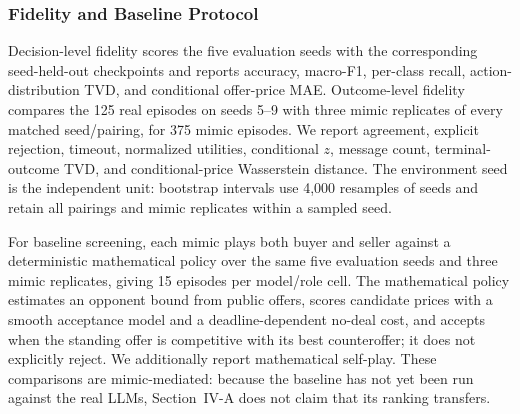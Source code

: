 \documentclass[conference]{IEEEtran}
\begin{document}
\subsubsection{Fidelity and Baseline Protocol}

Decision-level fidelity scores the five evaluation seeds with the corresponding seed-held-out checkpoints and reports accuracy, macro-F1, per-class recall, action-distribution TVD, and conditional offer-price MAE. Outcome-level fidelity compares the 125 real episodes on seeds 5--9 with three mimic replicates of every matched seed/pairing, for 375 mimic episodes. We report agreement, explicit rejection, timeout, normalized utilities, conditional $z$, message count, terminal-outcome TVD, and conditional-price Wasserstein distance. The environment seed is the independent unit: bootstrap intervals use 4{,}000 resamples of seeds and retain all pairings and mimic replicates within a sampled seed.

For baseline screening, each mimic plays both buyer and seller against a deterministic mathematical policy over the same five evaluation seeds and three mimic replicates, giving 15 episodes per model/role cell. The mathematical policy estimates an opponent bound from public offers, scores candidate prices with a smooth acceptance model and a deadline-dependent no-deal cost, and accepts when the standing offer is competitive with its best counteroffer; it does not explicitly reject. We additionally report mathematical self-play. These comparisons are mimic-mediated: because the baseline has not yet been run against the real LLMs, Section~IV-A does not claim that its ranking transfers.






\end{document}
